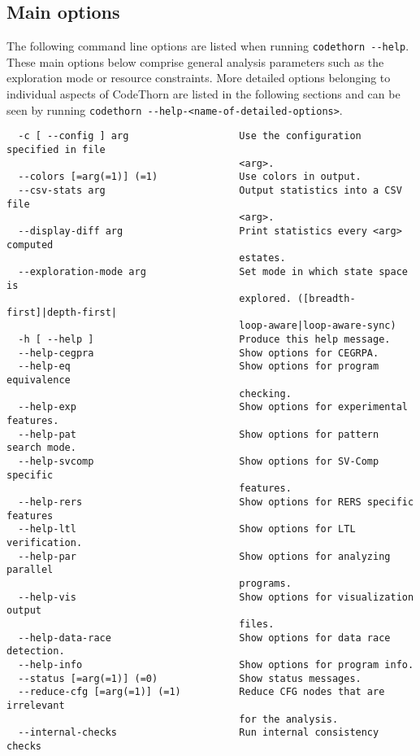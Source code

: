\documentclass[natbib]{article}
\begin{document}
\subsection{Main options}
The following command line options are listed when running \verb+codethorn --help+.
These main options below comprise general analysis parameters such as the exploration mode or resource constraints.
More detailed options belonging to individual aspects of CodeThorn are listed in the following sections and can be
seen by running \verb+codethorn --help-<name-of-detailed-options>+. 
\begin{verbatim}
  -c [ --config ] arg                   Use the configuration specified in file
                                        <arg>.
  --colors [=arg(=1)] (=1)              Use colors in output.
  --csv-stats arg                       Output statistics into a CSV file 
                                        <arg>.
  --display-diff arg                    Print statistics every <arg> computed 
                                        estates.
  --exploration-mode arg                Set mode in which state space is 
                                        explored. ([breadth-first]|depth-first|
                                        loop-aware|loop-aware-sync)
  -h [ --help ]                         Produce this help message.
  --help-cegpra                         Show options for CEGRPA.
  --help-eq                             Show options for program equivalence 
                                        checking.
  --help-exp                            Show options for experimental features.
  --help-pat                            Show options for pattern search mode.
  --help-svcomp                         Show options for SV-Comp specific 
                                        features.
  --help-rers                           Show options for RERS specific features
  --help-ltl                            Show options for LTL verification.
  --help-par                            Show options for analyzing parallel 
                                        programs.
  --help-vis                            Show options for visualization output 
                                        files.
  --help-data-race                      Show options for data race detection.
  --help-info                           Show options for program info.
  --status [=arg(=1)] (=0)              Show status messages.
  --reduce-cfg [=arg(=1)] (=1)          Reduce CFG nodes that are irrelevant 
                                        for the analysis.
  --internal-checks                     Run internal consistency checks 

\end{verbatim}
\end{document}
